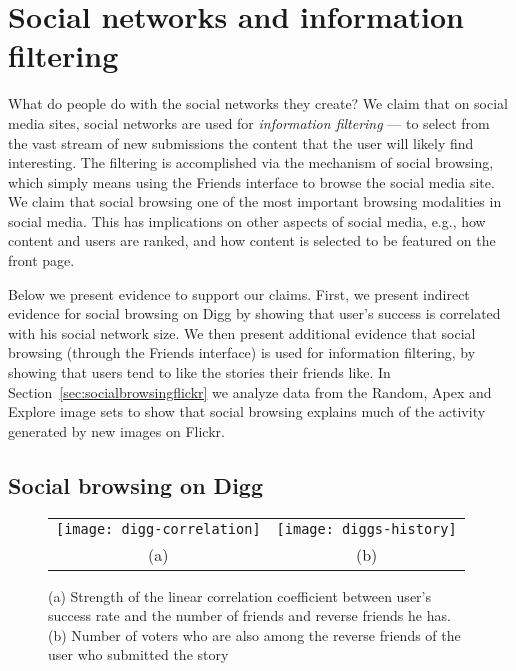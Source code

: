 \documentclass[]{article}
\newcommand{\source}[1]{\textsf{#1}}
\newcommand{\secref}[1]{Section~\ref{#1}}
\begin{document}
\section{Social networks and information filtering}
\label{sec:browsing}
What do people do with the social networks they create?
We claim that on social media sites, social networks are used for \emph{information
filtering} ---
to select from the vast stream of new submissions the
content that the user will likely find interesting. The filtering is
accomplished via the mechanism of social browsing, which simply
means using the Friends interface to browse the social media site.
We claim that social browsing one of the most important browsing
modalities in social media. This has implications on
other aspects of social media, e.g., how content and users are ranked, and how content is selected to be
featured on the front page.

Below we present evidence to support our claims.
First, we present indirect evidence for social browsing on Digg by showing that
user's success is correlated with his social network size.
We then present additional evidence that social browsing (through the Friends
interface) is used for information filtering, by showing that users
tend to like the stories their friends like.
In \secref{sec:socialbrowsingflickr} we analyze data from the
\source{Random}, \source{Apex} and \source{Explore} image sets to show that social
browsing explains much of the activity generated by new images on Flickr.


\subsection{Social browsing on Digg}
\label{sec:socialbrowsingdigg}

\begin{figure}[tbh]
\center
\begin{tabular}{cc}
  \texttt{[image: digg-correlation]} &
    \texttt{[image: diggs-history]} \\
 (a) & (b)
 \end{tabular}
  \caption{(a) Strength of the linear correlation coefficient between user's success rate and the number
  of friends and reverse friends he has. (b) Number of voters who are also among
  the reverse friends of the user who submitted the story}\label{fig:digg-correlation}
\end{figure}
\end{document}
